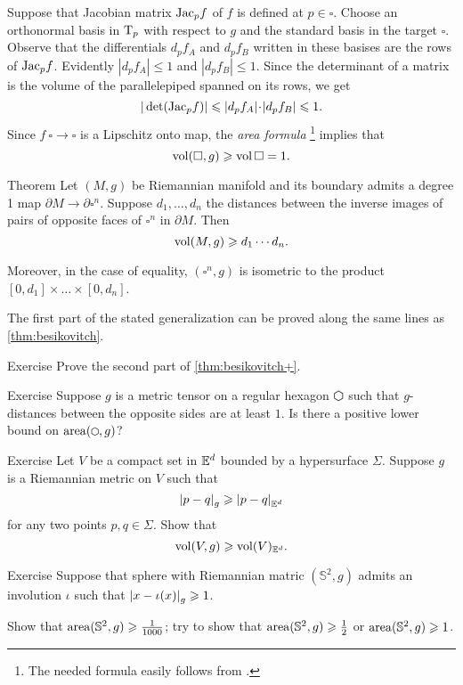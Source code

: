 Suppose that Jacobian  matrix $\mathrm{Jac}_pf$ of $f$ is defined at $p\in \square$.
Choose an orthonormal basis in $\mathrm{T}_p$ with respect to $g$ and the standard basis in the target $\square$.
Observe that the differentials $d_pf_A$ and $d_pf_B$ written in these basises are the rows of $\mathrm{Jac}_pf$.
Evidently $|d_pf_A|\le 1$ and $|d_pf_B|\le 1$.
Since the determinant of a matrix is the volume of the parallelepiped spanned on its rows, we get 
\[|\det(\Jac_pf)|\le |d_pf_A|\cdot|d_pf_B|\le 1.\]
Since $f\:\square\to\square$ is a Lipschitz onto map, the {}\emph{area formula}%
\footnote{The needed formula easily follows from \cite[3.2.3]{federer}.} implies that 
\[\operatorname{\rm vol}\nolimits(\square,g)\geqslant \operatorname{\rm vol}\nolimits\square=1.\]
\qedsf


\begin{thm}{Theorem}\label{thm:besikovitch+}
Let $(M,g)$ be Riemannian manifold and its boundary admits a degree 1 map $\partial M\to\partial\square^n$. 
Suppose $d_1,\dots, d_n$ the distances between the inverse images of pairs of opposite faces of $\square^n$ in $\partial M$.
Then 
\[\operatorname{\rm vol}\nolimits(M,g)\geqslant d_1\cdots d_n.\]

Moreover, in the case of equality, $(\square^n,g)$ is isometric to the product $[0,d_1]\times\dots\times[0,d_n]$.
\end{thm}

The first part of the stated generalization can be proved along the same lines as \ref{thm:besikovitch}.

\begin{thm}{Exercise}\label{ex:besikovitch=}
Prove the second part of \ref{thm:besikovitch+}.
\end{thm}

\begin{thm}{Exercise}\label{ex:hexagon}
Suppose $g$ is a metric tensor on a regular hexagon $\varhexagon
   $ such that $g$-distances between the opposite sides are at least $1$.
Is there a positive lower bound on $\area(\varhexagon,g)$?
\end{thm}

\begin{thm}{Exercise}\label{ex:gadograph}
Let $V$ be a compact set in $\mathbb{E}^d$ bounded by a hypersurface $\Sigma$.
Suppose $g$ is a Riemannian metric on $V$ such that 
\[\dist{p}{q}{g}\ge\dist{p}{q}{\EE^d}\]
for any two points $p,q\in \Sigma$.
Show that
\[\operatorname{\rm vol}\nolimits(V,g)\geqslant \operatorname{\rm vol}\nolimits(V)_{\mathbb{E}^d}.\]
 
\end{thm}

\begin{thm}{Exercise}\label{ex:involution-of-sphere}
Suppose that sphere with Riemannian matric $(\mathbb{S}^2,g)$ admits an involution $\iota$ such that $\dist{x}{\iota(x)}{g}\ge 1$.

Show that $\operatorname{\rm area}\nolimits(\mathbb{S}^2,g)\geqslant \tfrac1{1000}$;
try to show that $\operatorname{\rm area}\nolimits(\mathbb{S}^2,g)\geqslant \tfrac12$ or $\operatorname{\rm area}\nolimits(\mathbb{S}^2,g)\geqslant 1$.
\end{thm}

